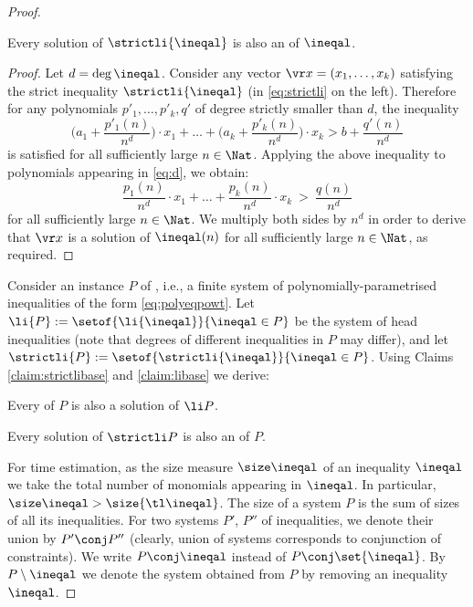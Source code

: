 \begin{proof}
\begin{claim} \label{claim:strictlibase}
Every solution of $\strictli {\ineqal}$ is also an \aasol of $\ineqal$.
\end{claim}
%
\begin{proof}
Let $d = \deg \ineqal$. 
Consider any vector $\vr x = (x_1, \ldots, x_k)$  satisfying
the strict inequality $\strictli {\ineqal}$ (in \eqref{eq:strictli} on the left). 
Therefore for any polynomials $p'_1, \ldots, p'_k, q'$ of degree strictly smaller than $d$,
the inequality
\[
\Big(a_1 + \frac{p'_1(n)}{n^d}\Big) \cdot x_1 + \ldots + 
\Big(a_k + \frac{p'_k(n)}{n^d} \Big) \cdot x_k > 
b + \frac{q'(n)}{n^d}
\]
is satisfied for all sufficiently large $n\in\Nat$.
Applying the above inequality to polynomials appearing in \eqref{eq:d}, we obtain:
\[
\frac{p_1(n)}{n^d} \cdot x_1 + \ldots + \frac{p_k(n)}{n^d} \cdot x_k \ > \ \frac{q(n)}{n^d}
\]
for all sufficiently large $n\in\Nat$.
We multiply both sides by $n^d$ in order to derive that 
$\vr x$ is a solution of $\ineqal(n)$ for all sufficiently large $n\in\Nat$,
as required.
\end{proof}


Consider an instance $P$ of \polyineqsolvname, i.e., a finite system of 
polynomially-parametrised inequalities of the form \eqref{eq:polyeqpowt}.
Let $\li{P} := \setof{\li{\ineqal}}{\ineqal\in P}$ be the system of head inequalities
(note that degrees of different inequalities in $P$ may differ), and let
$\strictli{P} := \setof{\strictli{\ineqal}}{\ineqal\in P}$.
Using Claims \ref{claim:strictlibase} and \ref{claim:libase} we derive:

\begin{claim} \label{claim:li}
Every \aasol of $P$ is also a solution of \xspace $\li P$.
\end{claim}

\begin{claim} \label{claim:strictli}
Every solution of $\strictli P$ is also an \aasol of $P$.
\end{claim}

%

For time estimation, as the size measure $\size \ineqal$ of an inequality $\ineqal$ we take the total number of monomials
appearing in $\ineqal$.
In particular, $\size \ineqal > \size {\tl \ineqal}$.
The size of a system $P$ is the sum of sizes of all its inequalities.
For two systems $P'$, $P''$ of inequalities, we denote their union by $P'\conj P''$
(clearly, union of systems corresponds to conjunction of constraints).
We write $P\conj\ineqal$ instead of $P\conj\set{\ineqal}$.
By $P\setminus \ineqal$ we denote the system obtained from $P$ by removing an inequality $\ineqal$.


\end{proof}
